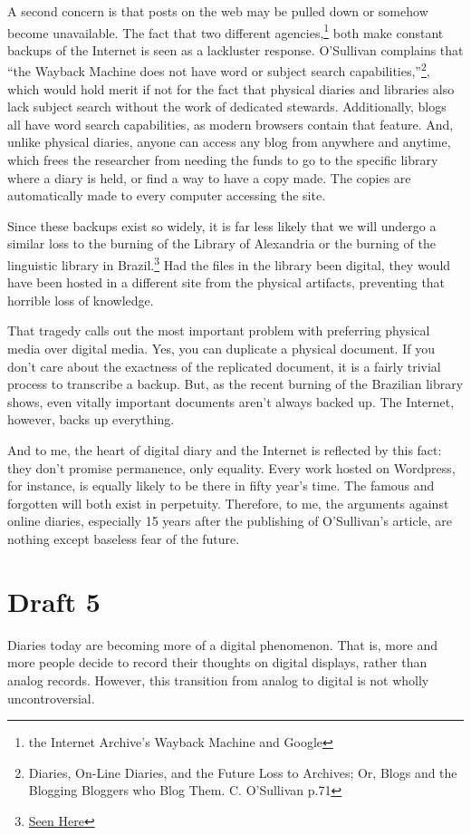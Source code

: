 \documentclass[12pt]{article}[titlepage]
\newcommand{\say}[1]{``#1''}
\newcommand{\1}{\={a}}
\newcommand{\2}{\={e}}
\newcommand{\3}{\={\i}}
\newcommand{\4}{\=o}
\newcommand{\5}{\=u}
\newcommand{\6}{\={A}}
\renewcommand{\,}{\textsuperscript{,}}
\begin{document}
A second concern is that posts on the web may be pulled down or somehow become unavailable.
The fact that two different agencies,\footnote{the Internet Archive’s Wayback Machine and Google} both make constant backups of the Internet is seen as a lackluster response.
O’Sullivan complains that \say{the Wayback Machine does not have word or subject search capabilities,}\footnote{Diaries, On-Line Diaries, and the Future Loss to Archives; Or, Blogs and the Blogging Bloggers who Blog Them. C. O’Sullivan p.71}, which would hold merit if not for the fact that physical diaries and libraries also lack subject search without the work of dedicated stewards.
Additionally, blogs all have word search capabilities, as modern browsers contain that feature.
And, unlike physical diaries, anyone can access any blog from anywhere and anytime, which frees the researcher from needing the funds to go to the specific library where a diary is held, or find a way to have a copy made.
The copies are automatically made to every computer accessing the site.

Since these backups exist so widely, it is far less likely that we will undergo a similar loss to the burning of the Library of Alexandria or the burning of the linguistic library in Brazil.\footnote{\href{https://www.nationalgeographic.com/science/2018/09/news-museu-nacional-fire-rio-de-janeiro-natural-history/}{Seen Here}}
Had the files in the library been digital, they would have been hosted in a different site from the physical artifacts, preventing that horrible loss of knowledge.

That tragedy calls out the most important problem with preferring physical media over digital media.
Yes, you can duplicate a physical document.
If you don’t care about the exactness of the replicated document, it is a fairly trivial process to transcribe a backup.
But, as the recent burning of the Brazilian library shows, even vitally important documents aren’t always backed up.
The Internet, however, backs up everything.

And to me, the heart of digital diary and the Internet is reflected by this fact: they don’t promise permanence, only equality.
Every work hosted on Wordpress, for instance, is equally likely to be there in fifty year’s time.
The famous and forgotten will both exist in perpetuity.
Therefore, to me, the arguments against online diaries, especially 15 years after the publishing of O’Sullivan’s article, are nothing except baseless fear of the future.

\section{Draft 5}
Diaries today are becoming more of a digital phenomenon.
That is, more and more people decide to record their thoughts on digital displays, rather than analog records.
However, this transition from analog to digital is not wholly uncontroversial.
\end{document}
